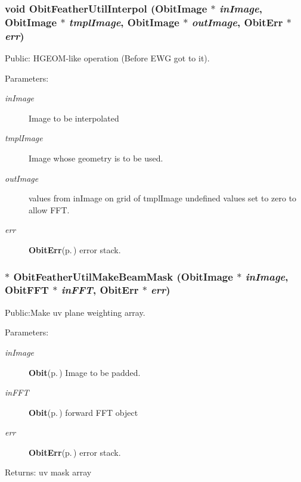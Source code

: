 \subsubsection{\setlength{\rightskip}{0pt plus 5cm}void Obit\-Feather\-Util\-Interpol ({\bf Obit\-Image} $\ast$ {\em in\-Image}, {\bf Obit\-Image} $\ast$ {\em tmpl\-Image}, {\bf Obit\-Image} $\ast$ {\em out\-Image}, {\bf Obit\-Err} $\ast$ {\em err})}\label{ObitFeatherUtil_8c_a10}


Public: HGEOM-like operation (Before EWG got to it). 

\begin{Desc}
\item[Parameters:]
\begin{description}
\item[{\em in\-Image}]Image to be interpolated \item[{\em tmpl\-Image}]Image whose geometry is to be used. \item[{\em out\-Image}]values from in\-Image on grid of tmpl\-Image undefined values set to zero to allow FFT. \item[{\em err}]{\bf Obit\-Err}{\rm (p.\,\pageref{structObitErr})} error stack. \end{description}
\end{Desc}
\subsubsection{$\ast$ Obit\-Feather\-Util\-Make\-Beam\-Mask ({\bf Obit\-Image} $\ast$ {\em in\-Image}, {\bf Obit\-FFT} $\ast$ {\em in\-FFT}, {\bf Obit\-Err} $\ast$ {\em err})}\label{ObitFeatherUtil_8c_a7}


Public:Make uv plane weighting array. 

\begin{Desc}
\item[Parameters:]
\begin{description}
\item[{\em in\-Image}]{\bf Obit}{\rm (p.\,\pageref{structObit})} Image to be padded. \item[{\em in\-FFT}]{\bf Obit}{\rm (p.\,\pageref{structObit})} forward FFT object \item[{\em err}]{\bf Obit\-Err}{\rm (p.\,\pageref{structObitErr})} error stack. \end{description}
\end{Desc}
\begin{Desc}
\item[Returns:]uv mask array \end{Desc}
